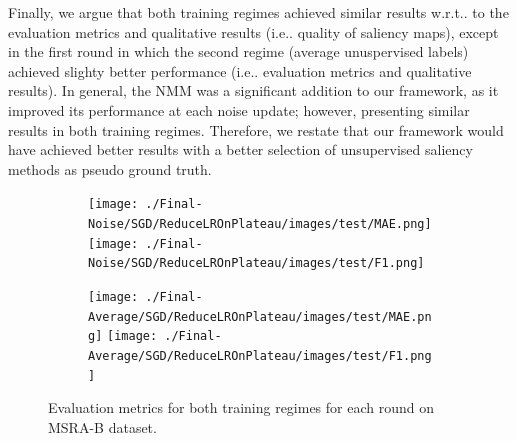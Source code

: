 \documentclass{article}
\makeatletter
\DeclareRobustCommand\onedot{\futurelet\@let@token\@onedot}
\def\@onedot{\ifx\@let@token.\else.\null\fi\xspace}
\def\ie{i.e\onedot} \def\Ie{I.e\onedot}
\def\wrt{w.r.t\onedot} \def\dof{d.o.f\onedot}
\makeatother
\begin{document}
Finally, we argue that both training regimes achieved similar results \wrt to the evaluation metrics and qualitative results (\ie quality of saliency maps), except in the first round in which the second regime (average unuspervised labels) achieved slighty better performance (\ie evaluation metrics and qualitative results). In general, the NMM was a significant addition to our framework, as it improved its performance at each noise update; however, presenting similar results in both training regimes. Therefore, we restate that our framework would have achieved better results with a better selection of unsupervised saliency methods as pseudo ground truth. 

\begin{figure}[h]
  \centering
  \begin{subfigure}[c]{0.4\textwidth}
    \centering
      \texttt{[image: ./Final-Noise/SGD/ReduceLROnPlateau/images/test/MAE.png]}
      \texttt{[image: ./Final-Noise/SGD/ReduceLROnPlateau/images/test/F1.png]}
  \end{subfigure}
  \begin{subfigure}[c]{0.4\textwidth}
    \centering
      \texttt{[image: ./Final-Average/SGD/ReduceLROnPlateau/images/test/MAE.png]}
      \texttt{[image: ./Final-Average/SGD/ReduceLROnPlateau/images/test/F1.png]}
  \end{subfigure}
  \caption{Evaluation metrics for both training regimes for each round on MSRA-B dataset.}
  \label{fig:ablation}
\end{figure}
\end{document}
